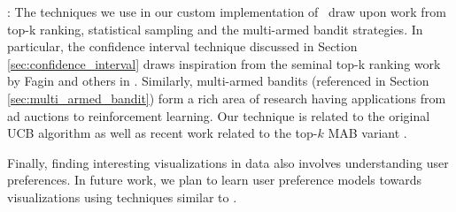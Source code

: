 :
The techniques we use in our custom implementation of \VizRecDB\ draw upon work
from top-k ranking, statistical sampling and the multi-armed bandit strategies. 
In particular, the confidence interval technique discussed in Section
\ref{sec:confidence_interval} draws inspiration from the seminal top-k ranking
work by Fagin and others in \cite{DBLP:conf/pods/FaginLN01, DBLP:conf/vldb/IlyasAE04}.
Similarly, multi-armed bandits (referenced in Section
\ref{sec:multi_armed_bandit}) form 
a rich area of research having applications from ad auctions to reinforcement learning. 
Our technique is related to the original UCB algorithm \cite{AuerCF02, LaiR85}
as well as recent work related to the top-$k$ MAB variant \cite{BubeckWV13,
audibert2010best}.

Finally, finding interesting visualizations in data also involves understanding
user preferences. 
In future work, we plan to learn user preference models towards visualizations
using techniques similar to \cite{CHI:YangLZ14, IUIGotzW09}. 

